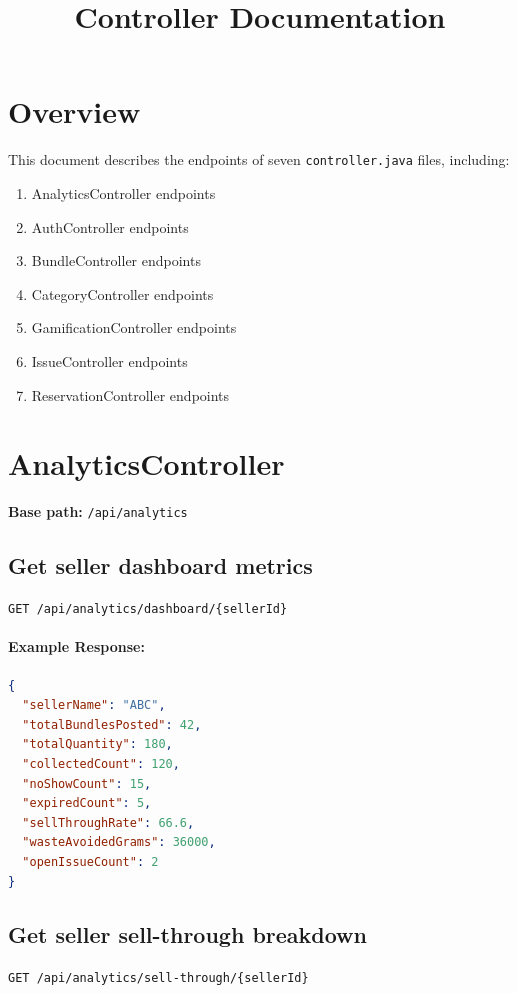 \documentclass[a4paper,11pt]{article}
\title{\textbf{Controller Documentation}}
\begin{document}
\maketitle

\section*{Overview}
This document describes the endpoints of seven \texttt{controller.java} files, including:

\begin{enumerate}[label=\arabic*.]
    \item AnalyticsController endpoints
    \item AuthController endpoints
    \item BundleController endpoints
    \item CategoryController endpoints
    \item GamificationController endpoints
    \item IssueController endpoints
    \item ReservationController endpoints
\end{enumerate}

\hrulefill

\section{AnalyticsController}
\textbf{Base path:} \texttt{/api/analytics}

\subsection{Get seller dashboard metrics}
\texttt{GET /api/analytics/dashboard/\{sellerId\}}

\paragraph{Example Response:}
\begin{lstlisting}[language=json]
{
  "sellerName": "ABC",
  "totalBundlesPosted": 42,
  "totalQuantity": 180,
  "collectedCount": 120,
  "noShowCount": 15,
  "expiredCount": 5,
  "sellThroughRate": 66.6,
  "wasteAvoidedGrams": 36000,
  "openIssueCount": 2
}
\end{lstlisting}

\subsection{Get seller sell-through breakdown}
\texttt{GET /api/analytics/sell-through/\{sellerId\}}
\end{document}
